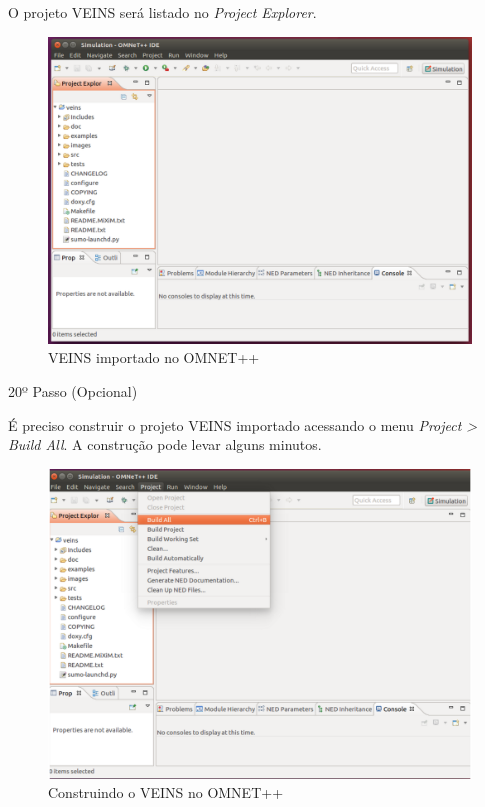 \documentclass[
12pt,				%
openright,			%
oneside,			%
a4paper,			%
brazil,				%
]{abntex2}
\begin{document}
{\begin{anexosenv}
                \par O projeto VEINS será listado no \textit{Project Explorer}.
		            
                \begin{figure} [H]
	                \centering
	                \includegraphics[scale=.27]{figuras/aneB/60ProjetoImportado}
	                \caption{\label{fig_60}VEINS importado no OMNET++}
                \end{figure}
                    
				\newpage                
            	\begin{description}
	                \item[20º Passo (Opcional)]
	            \end{description}
	            \par É preciso construir o projeto VEINS importado acessando o menu \textit{Project > Build All}. A construção pode levar alguns minutos.
		            
                \begin{figure} [H]
	                \centering
	                \includegraphics[scale=.25]{figuras/aneB/61ConstruindoVeins}
	                \caption{\label{fig_61}Construindo o VEINS no OMNET++}
                \end{figure}
                

\end{anexosenv}}
\end{document}
